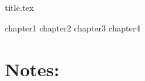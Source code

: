 \documentclass[a4paper,11pt]{book}
\begin{document}
\frontmatter
{title.tex}

\clearpage
\thispagestyle{empty}

\tableofcontents
\listoffigures

\mainmatter

{chapter1}
{chapter2}
{chapter3}
{chapter4}

\backmatter

\chapter*{Notes:}
\end{document}
